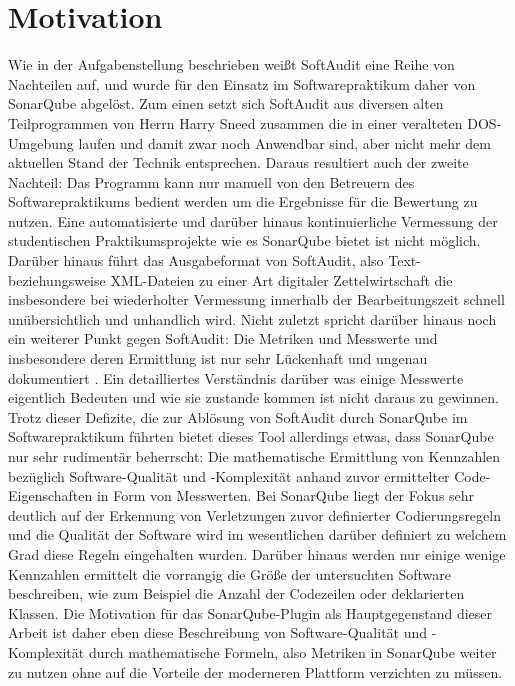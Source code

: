\documentclass[gb,ngerman]{stthesis}
\begin{document}
  		\section{Motivation}
  		Wie in der Aufgabenstellung beschrieben weißt SoftAudit eine Reihe von Nachteilen auf, und wurde für den Einsatz im Softwarepraktikum daher von SonarQube abgelöst. Zum einen setzt sich SoftAudit aus diversen alten Teilprogrammen von Herrn Harry Sneed zusammen die in einer veralteten DOS-Umgebung laufen und damit zwar noch Anwendbar sind, aber nicht mehr dem aktuellen Stand der Technik entsprechen. Daraus resultiert auch der zweite Nachteil: Das Programm kann nur manuell von den Betreuern des Softwarepraktikums bedient werden um die Ergebnisse für die Bewertung zu nutzen. Eine automatisierte und darüber hinaus kontinuierliche Vermessung der studentischen Praktikumsprojekte wie es SonarQube bietet ist nicht möglich. Darüber hinaus führt das Ausgabeformat von SoftAudit, also Text- beziehungsweise XML-Dateien zu einer Art digitaler Zettelwirtschaft die insbesondere bei wiederholter Vermessung innerhalb der Bearbeitungszeit schnell unübersichtlich und unhandlich wird. Nicht zuletzt spricht darüber hinaus noch ein weiterer Punkt gegen SoftAudit: Die Metriken und Messwerte und insbesondere deren Ermittlung ist nur sehr Lückenhaft und ungenau dokumentiert \cite{SoftAuditDoku}. Ein detailliertes Verständnis darüber was einige Messwerte eigentlich Bedeuten und wie sie zustande kommen ist nicht daraus zu gewinnen. \newline
  		Trotz dieser Defizite, die zur Ablösung von SoftAudit durch SonarQube im Softwarepraktikum führten bietet dieses Tool allerdings etwas, dass SonarQube nur sehr rudimentär beherrscht: Die mathematische Ermittlung von Kennzahlen bezüglich Software-Qualität und -Komplexität anhand zuvor ermittelter Code-Eigenschaften in Form von Messwerten. Bei SonarQube liegt der Fokus sehr deutlich auf der Erkennung von Verletzungen zuvor definierter Codierungsregeln und die Qualität der Software wird im wesentlichen darüber definiert zu welchem Grad diese Regeln eingehalten wurden. Darüber hinaus werden nur einige wenige Kennzahlen ermittelt die vorrangig die Größe der untersuchten Software beschreiben, wie zum Beispiel die Anzahl der Codezeilen oder deklarierten Klassen. \newline
  		Die Motivation für das SonarQube-Plugin als Hauptgegenstand dieser Arbeit ist daher eben diese Beschreibung von Software-Qualität und -Komplexität durch mathematische Formeln, also Metriken in SonarQube weiter zu nutzen ohne auf die Vorteile der moderneren Plattform verzichten zu müssen. \newline
  		
\end{document}
